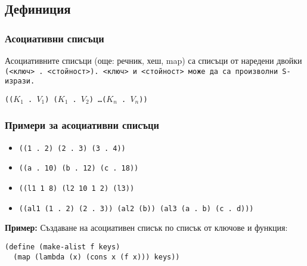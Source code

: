 \documentclass[alsotrans,beameroptions={aspectratio=169}]{beamerswitch}
\begin{document}
\subsection{Дефиниция}

\begin{frame}
  \frametitle{Асоциативни списъци}

  \begin{definition}
    Асоциативните списъци (още: речник, хеш, map) са списъци от наредени двойки \tt(<ключ> \tt. <стойност>\tt). <ключ> и <стойност> може да са произволни S-изрази.
  \end{definition}
  \vspace{2ex}
  \tt{((}$K_1$ \tt. $V_1$\tt) \tt($K_1$ \tt. $V_2$\tt) \ldots \tt($K_n$ \tt. $V_n$\tt{))}\\[2ex]
\end{frame}

\begin{frame}[fragile]
  \frametitle{Примери за асоциативни списъци}

  \begin{itemize}[<+->]
  \item \tt{((1 . 2) (2 . 3) (3 . 4))}
  \item \tt{((a . 10) (b . 12) (c . 18))}
  \item \tt{((l1 1 8) (l2 10 1 2) (l3))}
  \item \tt{((al1 (1 . 2) (2 . 3)) (al2 (b)) (al3 (a . b) (c . d)))}
  \end{itemize}
  \vspace{2ex}
  \onslide<+->
  \textbf{Пример:}
  Създаване на асоциативен списък по списък от ключове и функция:
\begin{lstlisting}
(define (make-alist f keys)
  (map (lambda (x) (cons x (f x))) keys))
\end{lstlisting}
  \onslide<+->
\end{frame}
\end{document}
